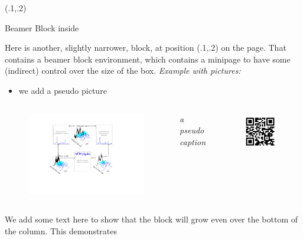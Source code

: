 	\begin{textblock}{.2}(.1,.2)
    \begin{block}{Beamer Block inside}
      \begin{minipage}[t][50cm][t]{\textwidth}	
		    Here is another, slightly narrower, block, at position (.1,.2) on the page.
        That contains a beamer block environment, which contains a minipage to 
        have some (indirect) control over the size of the box.
        \alert{\textit{Example with pictures:}}
        \begin{itemize}
        	\item we add a pseudo picture
        \end{itemize}
        \vspace{1cm}
        \begin{columns}
        	\begin{figure}[tb]
        	\begin{center}
        		\includegraphics[width=.55\textwidth]{images/content/FIG1.pdf}
        	\end{center}
        	\end{figure}
        \small{\textit{a pseudo caption}}
        \vspace{4cm}
        	\begin{figure}[tb]
        		\includegraphics[width=.6\textwidth]{images/qrcode-RSCAPE.jpg}
        	\end{figure}
        \end{columns}
        \vspace{1cm}
        We add some text here to show that the block will grow even over the bottom of the column. This demonstrates
      \end{minipage}
    \end{block}
   \end{textblock}

